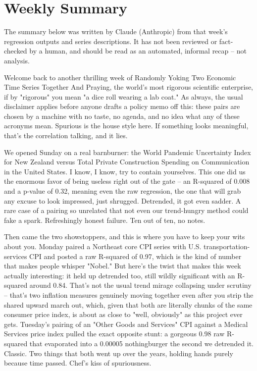 \section{Weekly Summary}

\begin{tcolorbox}[colback=yellow!10,colframe=black!50,title=AI-Generated Content]
\noindent The summary below was written by Claude (Anthropic) from that week's regression outputs and series descriptions. It has not been reviewed or fact-checked by a human, and should be read as an automated, informal recap -- not analysis.
\end{tcolorbox}

Welcome back to another thrilling week of Randomly Yoking Two Economic Time Series Together And Praying, the world's most rigorous scientific enterprise, if by "rigorous" you mean "a dice roll wearing a lab coat." As always, the usual disclaimer applies before anyone drafts a policy memo off this: these pairs are chosen by a machine with no taste, no agenda, and no idea what any of these acronyms mean. Spurious is the house style here. If something looks meaningful, that's the correlation talking, and it lies.

We opened Sunday on a real barnburner: the World Pandemic Uncertainty Index for New Zealand versus Total Private Construction Spending on Communication in the United States. I know, I know, try to contain yourselves. This one did us the enormous favor of being useless right out of the gate -- an R-squared of 0.008 and a p-value of 0.32, meaning even the raw regression, the one that will grab any excuse to look impressed, just shrugged. Detrended, it got even sadder. A rare case of a pairing so unrelated that not even our trend-hungry method could fake a spark. Refreshingly honest failure. Ten out of ten, no notes.

Then came the two showstoppers, and this is where you have to keep your wits about you. Monday paired a Northeast core CPI series with U.S. transportation-services CPI and posted a raw R-squared of 0.97, which is the kind of number that makes people whisper "Nobel." But here's the twist that makes this week actually interesting: it held up detrended too, still wildly significant with an R-squared around 0.84. That's not the usual trend mirage collapsing under scrutiny -- that's two inflation measures genuinely moving together even after you strip the shared upward march out, which, given that both are literally chunks of the same consumer price index, is about as close to "well, obviously" as this project ever gets. Tuesday's pairing of an "Other Goods and Services" CPI against a Medical Services price index pulled the exact opposite stunt: a gorgeous 0.98 raw R-squared that evaporated into a 0.00005 nothingburger the second we detrended it. Classic. Two things that both went up over the years, holding hands purely because time passed. Chef's kiss of spuriousness.

